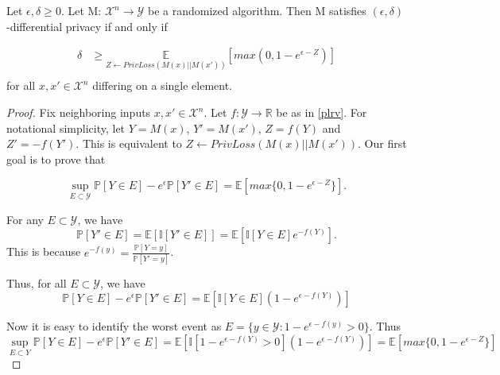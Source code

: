 \begin{lemma}
\label{delta-bound}
\cite{CKS20} Let $\epsilon, \delta \geq 0$. Let M: $\mathcal{X}^n \rightarrow \mathcal{Y}$ be a randomized algorithm. Then M satisfies $(\epsilon, \delta)$-differential privacy if and only if

\begin{align}
    \delta &\geq \underset{Z \leftarrow PrivLoss(M(x)|| M(x'))}{\mathbb{E}} [max(0, 1 - e^{\epsilon - Z})] \\
\end{align}
for all $x, x' \in \mathcal{X}^n$ differing on a single element.

\begin{proof}
Fix neighboring inputs $x, x' \in \mathcal{X}^n$. 
Let $f: \mathcal{Y} \rightarrow \mathbb{R}$ be as in \ref{plrv}.
For notational simplicity, let $Y = M(x)$, $Y' = M(x')$, $Z = f(Y)$ and $Z' = -f(Y')$.
This is equivalent to $Z \leftarrow PrivLoss(M(x) || M(x'))$.
Our first goal is to prove that

\begin{equation}
    \sup\limits_{E \subset \mathcal{Y}} \mathbb{P}[Y \in E] - e^\epsilon \mathbb{P}[Y' \in E] = \mathbb{E}[max\{0, 1 - e^{\epsilon - Z}\}].
\end{equation}

For any $E \subset \mathcal{Y}$, we have
\begin{equation}
    \mathbb{P}[Y' \in E] = \mathbb{E}[\mathbb{I}[Y' \in E]] = \mathbb{E}[\mathbb{I}[Y \in E] e^{-f(Y)}].
\end{equation}
This is because $e^{-f(y)} = \frac{\mathbb{P}[Y=y]}{\mathbb{P}[Y'=y]}$.

Thus, for all $E \subset \mathcal{Y}$, we have 
\begin{equation}
    \mathbb{P}[Y \in E] - e^\epsilon \mathbb{P}[Y' \in E] = \mathbb{E} \left[ \mathbb{I}[Y \in E] (1 - e^{\epsilon - f(Y)}) \right]
\end{equation}

Now it is easy to identify the worst event as $E = \{y \in \mathcal{Y} : 1 - e^{\epsilon - f(y)} > 0\}$. Thus
\begin{equation}
    \sup\limits_{E \subset Y} \mathbb{P}[Y \in E] - e^{\epsilon} \mathbb{P}[Y' \in E] = \mathbb{E} \left[ \mathbb{I}[1 - e^{\epsilon - f(Y)} > 0] (1 - e^{\epsilon - f(Y)}) \right] = \mathbb{E}[max\{ 0, 1 - e^{\epsilon - Z} \}]
\end{equation}


\end{proof}
\end{lemma}
